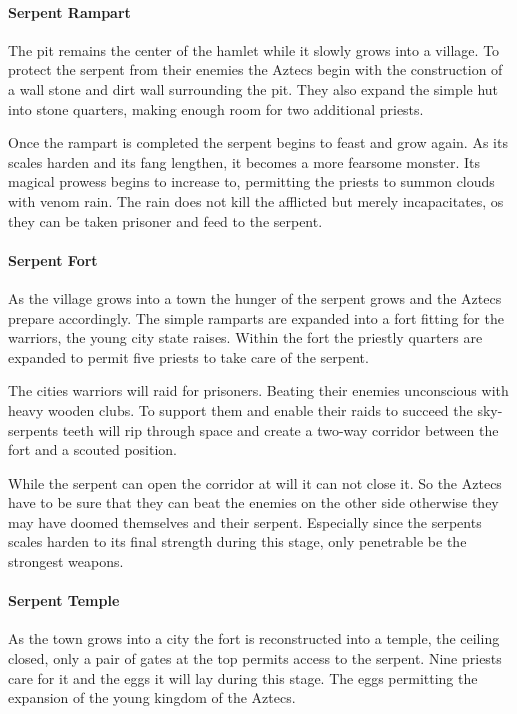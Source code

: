 \paragraph{Serpent Rampart}
The pit remains the center of the hamlet while it slowly grows into a village.
To protect the serpent from their enemies the \gls{Aztecs} begin with the
construction of a wall stone and dirt wall surrounding the pit. They also
expand the simple hut into stone quarters, making enough room for two
additional priests.

Once the rampart is completed the serpent begins to feast and grow again. As
its scales harden and its fang lengthen, it becomes a more fearsome monster.
Its magical prowess begins to increase to, permitting the priests to summon
clouds with venom rain. The rain does not kill the afflicted but merely
incapacitates, os they can be taken prisoner and feed to the serpent.

\paragraph{Serpent Fort}
As the village grows into a town the hunger of the serpent grows and the
\gls{Aztecs} prepare accordingly. The simple ramparts are expanded into a fort
fitting for the warriors, the young city state raises. Within the fort the
priestly quarters are expanded to permit five priests to take care of the
serpent.

The cities warriors will raid for prisoners. Beating their enemies unconscious
with heavy wooden clubs. To support them and enable their raids to succeed the
sky-serpents teeth will rip through space and create a two-way corridor between
the fort and a scouted position.

While the serpent can open the corridor at will it can not close it. So the
\gls{Aztecs} have to be sure that they can beat the enemies on the other side
otherwise they may have doomed themselves and their serpent. Especially since
the serpents scales harden to its final strength during this stage, only
penetrable be the strongest weapons.

\paragraph{Serpent Temple}
As the town grows into a city the fort is reconstructed into a temple, the
ceiling closed, only a pair of gates at the top permits access to the serpent.
Nine priests care for it and the eggs it will lay during this stage. The eggs
permitting the expansion of the young kingdom of the \gls{Aztecs}.

